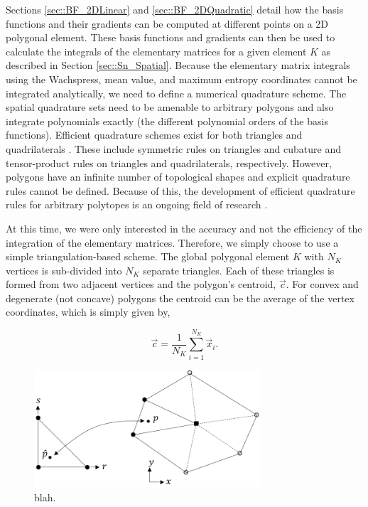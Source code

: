 Sections \ref{sec::BF_2DLinear} and \ref{sec::BF_2DQuadratic} detail how the basis functions and their gradients can be computed at different points on a 2D polygonal element. These basis functions and gradients can then be used to calculate the integrals of the elementary matrices for a given element $K$ as described in Section \ref{sec::Sn_Spatial}. Because the elementary matrix integrals using the Wachspress, mean value, and maximum entropy coordinates cannot be integrated analytically, we need to define a numerical quadrature scheme. The spatial quadrature sets need to be amenable to arbitrary polygons and also integrate polynomials exactly (the different polynomial orders of the basis functions). Efficient quadrature schemes exist for both triangles and quadrilaterals \cite{silvester1970symmetric,dunavant1985high,wandzurat2003symmetric,lyness1994survey,cools1987construction}. These include symmetric rules on triangles and cubature and tensor-product rules on triangles and quadrilaterals, respectively. However, polygons have an infinite number of topological shapes and explicit quadrature rules cannot be defined. Because of this, the development of efficient quadrature rules for arbitrary polytopes is an ongoing field of research \cite{nooijen1990symmetric,dasgupta2003integration,mousavi2010generalized}.

At this time, we were only interested in the accuracy and not the efficiency of the integration of the elementary matrices. Therefore, we simply choose to use a simple triangulation-based scheme. The global polygonal element $K$ with $N_K$ vertices is sub-divided into $N_K$ separate triangles. Each of these triangles is formed from two adjacent vertices and the polygon's centroid, $\vec{c}$. For convex and degenerate (not concave) polygons the centroid can be the average of the vertex coordinates, which is simply given by,

\begin{equation}
\label{eq::BF_2DInt_centroid}
\vec{c} = \frac{1}{N_K} \sum_{i=1}^{N_K} \vec{x}_i .
\end{equation}

\begin{figure}
\centering
\includegraphics[width=0.75\textwidth]{figures/sec_BF/triangle_mapping_Rev1.png}
\caption{blah.}
\label{fig::BF_2D_tri_mapping}
\end{figure}

